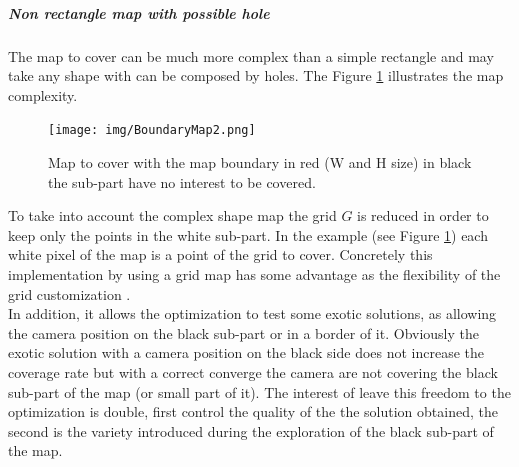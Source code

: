  \subparagraph{Non rectangle map with possible hole} \label{subPara:MapConstraintAndObstacle}
The map to cover can be much more complex than a simple rectangle and may take any shape with can be composed by holes. The Figure \ref{fig:boundaryMap} illustrates the map complexity.%
 \begin{figure}[t!]
 \begin{center}
   \texttt{[image: img/BoundaryMap2.png]}
  \caption{Map to cover with the map boundary in red (W and H size) in black the sub-part have no interest to  be covered.   }\label{fig:boundaryMap}
  \endminipage\hfill
  \end{center}
\end{figure}
To take into account the complex shape map %
the grid $G$ is reduced in order to keep only the points in the white sub-part. In the example (see Figure \ref{fig:boundaryMap}) each white pixel of the map is a point of the grid to cover. 
Concretely this implementation by using a grid map has some advantage as  the flexibility of the grid customization . \\
In addition, it allows the optimization to test some exotic solutions, as allowing the camera position on the black sub-part or in a border of it. Obviously the exotic solution with a camera position on the black side does not increase the coverage rate  but with a correct converge  the camera are not  covering the black sub-part of the map (or small part of it). The interest of leave this freedom to the optimization is double, first control the quality of the the solution obtained, the second is the variety introduced during the exploration of the black sub-part of the map. 

%

